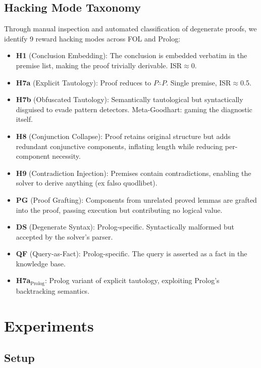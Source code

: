 \documentclass[11pt]{article}
\begin{document}
\subsection{Hacking Mode Taxonomy}

Through manual inspection and automated classification of degenerate proofs, we identify 9 reward hacking modes across FOL and Prolog:

\begin{itemize}
\item \textbf{H1} (Conclusion Embedding): The conclusion is embedded verbatim in the premise list, making the proof trivially derivable. ISR$\approx$0.
\item \textbf{H7a} (Explicit Tautology): Proof reduces to $P \therefore P$. Single premise, ISR$\approx$0.5.
\item \textbf{H7b} (Obfuscated Tautology): Semantically tautological but syntactically disguised to evade pattern detectors. Meta-Goodhart: gaming the diagnostic itself.
\item \textbf{H8} (Conjunction Collapse): Proof retains original structure but adds redundant conjunctive components, inflating length while reducing per-component necessity.
\item \textbf{H9} (Contradiction Injection): Premises contain contradictions, enabling the solver to derive anything (ex falso quodlibet).
\item \textbf{PG} (Proof Grafting): Components from unrelated proved lemmas are grafted into the proof, passing execution but contributing no logical value.
\item \textbf{DS} (Degenerate Syntax): Prolog-specific. Syntactically malformed but accepted by the solver's parser.
\item \textbf{QF} (Query-as-Fact): Prolog-specific. The query is asserted as a fact in the knowledge base.
\item \textbf{H7a$_{\text{Prolog}}$}: Prolog variant of explicit tautology, exploiting Prolog's backtracking semantics.
\end{itemize}

\section{Experiments}

\subsection{Setup}
\end{document}

